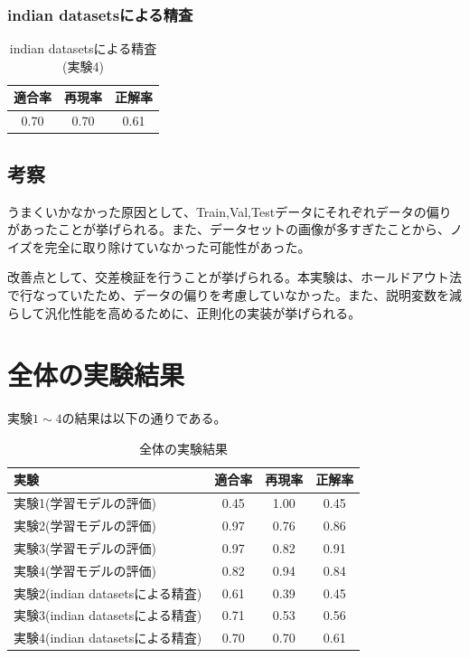 \documentclass[a4paper, 11pt, titlepage]{jsarticle}
\begin{document}
\clearpage

\subsubsection{indian datasetsによる精査}
\begin{table}[htb]
\centering
  \caption{indian datasetsによる精査(実験4)}
  \begin{tabular}{|c|c|c|}  \hline
    適合率 & 再現率 & 正解率 \\ \hline
    0.70 & 0.70 & 0.61 \\ \hline
  \end{tabular}
\end{table}

\subsection{考察}
うまくいかなかった原因として、Train,Val,Testデータにそれぞれデータの偏りがあったことが挙げられる。また、データセットの画像が多すぎたことから、ノイズを完全に取り除けていなかった可能性があった。\par
改善点として、交差検証を行うことが挙げられる。本実験は、ホールドアウト法で行なっていたため、データの偏りを考慮していなかった。また、説明変数を減らして汎化性能を高めるために、正則化の実装が挙げられる\cite{theme7}。

\section{全体の実験結果}
実験$1\sim4$の結果は以下の通りである。\par
\begin{table}[htb]
\centering
  \caption{全体の実験結果}
  \begin{tabular}{|l|c|c|c|}  \hline
    実験 & 適合率 & 再現率 & 正解率 \\ \hline \hline
    実験1(学習モデルの評価) & 0.45 & 1.00 & 0.45 \\ \hline
    実験2(学習モデルの評価) & 0.97 & 0.76 & 0.86 \\ \hline
    実験3(学習モデルの評価) & 0.97 & 0.82 & 0.91 \\ \hline
    実験4(学習モデルの評価) & 0.82 & 0.94 & 0.84 \\ \hline \hline
    実験2(indian datasetsによる精査) & 0.61 & 0.39 & 0.45 \\ \hline
    実験3(indian datasetsによる精査) & 0.71 & 0.53 & 0.56 \\ \hline
    実験4(indian datasetsによる精査) & 0.70 & 0.70 & 0.61 \\ \hline
  \end{tabular}
\end{table}
\end{document}

